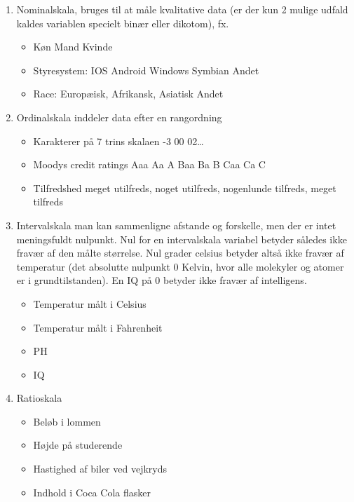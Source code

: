 \documentclass[]{book}
\providecommand{\tightlist}{%
  \setlength{\itemsep}{0pt}\setlength{\parskip}{0pt}}
\begin{document}
\begin{enumerate}
\def\labelenumi{\arabic{enumi}.}
\tightlist
\item
  Nominalskala, bruges til at måle kvalitative data (er der kun 2 mulige udfald kaldes variablen specielt binær eller dikotom), fx.

  \begin{itemize}
  \tightlist
  \item
    Køn Mand Kvinde\\
  \item
    Styresystem: IOS Android Windows Symbian Andet
  \item
    Race: Europæisk, Afrikansk, Asiatisk Andet
  \end{itemize}
\item
  Ordinalskala inddeler data efter en rangordning

  \begin{itemize}
  \tightlist
  \item
    Karakterer på 7 trins skalaen -3 00 02\ldots{}
  \item
    Moodys credit ratings Aaa Aa A Baa Ba B Caa Ca C
  \item
    Tilfredshed meget utilfreds, noget utilfreds, nogenlunde tilfreds, meget tilfreds
  \end{itemize}
\item
  Intervalskala man kan sammenligne afstande og forskelle, men der er intet meningsfuldt nulpunkt. Nul for en intervalskala variabel betyder således ikke fravær af den målte størrelse. Nul grader celsius betyder altså ikke fravær af temperatur (det absolutte nulpunkt 0 Kelvin, hvor alle molekyler og atomer er i grundtilstanden). En IQ på 0 betyder ikke fravær af intelligens.

  \begin{itemize}
  \tightlist
  \item
    Temperatur målt i Celsius
  \item
    Temperatur målt i Fahrenheit
  \item
    PH
  \item
    IQ
  \end{itemize}
\item
  Ratioskala

  \begin{itemize}
  \tightlist
  \item
    Beløb i lommen
  \item
    Højde på studerende
  \item
    Hastighed af biler ved vejkryds
  \item
    Indhold i Coca Cola flasker
  \end{itemize}
\end{enumerate}
\end{document}
